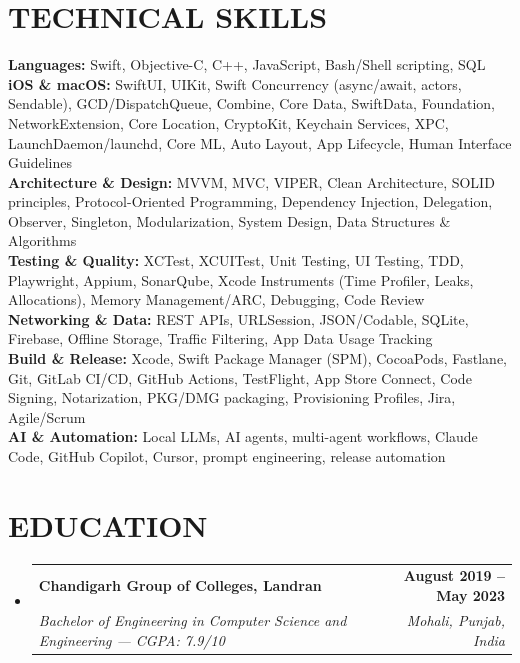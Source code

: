\documentclass[letterpaper,11pt]{article}
\makeatletter
\newcommand{\resumeSubheading}[4]{
  \vspace{-2pt}\item
    \begin{tabular*}{1.0\textwidth}[t]{l@{\extracolsep{\fill}}r}
      \textbf{\large#1} & \textbf{\small #2} \\
      \textit{\small#3} & \textit{\small #4} \\
    \end{tabular*}\vspace{-7pt}
}
\newcommand{\resumeSubHeadingListStart}{\begin{itemize}[leftmargin=0.0in, label={}]}
\newcommand{\resumeSubHeadingListEnd}{\end{itemize}}
\makeatother
\begin{document}
\section{TECHNICAL SKILLS}
 \begin{itemize}[leftmargin=0.15in, label={}]
    \small{\item{
     \textbf{Languages:} Swift, Objective-C, C++, JavaScript, Bash/Shell scripting, SQL \\ \vspace{2pt}
     \textbf{iOS \& macOS:} SwiftUI, UIKit, Swift Concurrency (async/await, actors, Sendable), GCD/DispatchQueue, Combine, Core Data, SwiftData, Foundation, NetworkExtension, Core Location, CryptoKit, Keychain Services, XPC, LaunchDaemon/launchd, Core ML, Auto Layout, App Lifecycle, Human Interface Guidelines \\ \vspace{2pt}
     \textbf{Architecture \& Design:} MVVM, MVC, VIPER, Clean Architecture, SOLID principles, Protocol-Oriented Programming, Dependency Injection, Delegation, Observer, Singleton, Modularization, System Design, Data Structures \& Algorithms \\ \vspace{2pt}
     \textbf{Testing \& Quality:} XCTest, XCUITest, Unit Testing, UI Testing, TDD, Playwright, Appium, SonarQube, Xcode Instruments (Time Profiler, Leaks, Allocations), Memory Management/ARC, Debugging, Code Review \\ \vspace{2pt}
     \textbf{Networking \& Data:} REST APIs, URLSession, JSON/Codable, SQLite, Firebase, Offline Storage, Traffic Filtering, App Data Usage Tracking \\ \vspace{2pt}
     \textbf{Build \& Release:} Xcode, Swift Package Manager (SPM), CocoaPods, Fastlane, Git, GitLab CI/CD, GitHub Actions, TestFlight, App Store Connect, Code Signing, Notarization, PKG/DMG packaging, Provisioning Profiles, Jira, Agile/Scrum \\ \vspace{2pt}
     \textbf{AI \& Automation:} Local LLMs, AI agents, multi-agent workflows, Claude Code, GitHub Copilot, Cursor, prompt engineering, release automation
    }}
 \end{itemize}

\vspace{-10pt}

\section{EDUCATION}
  \resumeSubHeadingListStart
    \resumeSubheading
      {Chandigarh Group of Colleges, Landran}{August 2019 -- May 2023}
      {Bachelor of Engineering in Computer Science and Engineering — CGPA: 7.9/10}{Mohali, Punjab, India}
  \resumeSubHeadingListEnd
\end{document}
